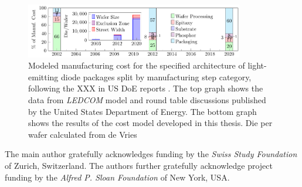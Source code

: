 \documentclass[a4paper,nocompress]{spie}  %
\begin{document}
\begin{figure} [ht]
    \begin{center}
        \includegraphics[width=0.85\textwidth]{SPIE/article/costmodel_calibration.pdf}
    \end{center}
    \caption{Modeled manufacturing cost for the specified architecture of light-emitting diode packages split by manufacturing step category, following the XXX in US DoE reports \cite{doe2016solid}. The top graph shows the data from \textit{LEDCOM} model and  round table discussions published by the United States Department of Energy. The bottom graph shows the results of the cost model developed in this thesis. Die per wafer calculated from de Vries \cite{deVries2005}}
    \label{fig:cost}
\end{figure}

\clearpage
\acknowledgments %
 
The main author gratefully acknowledges funding by the \textit{Swiss Study Foundation} of Zurich, Switzerland. The authors further gratefully acknowledge project funding by the \textit{Alfred P. Sloan Foundation} of New York, USA.

\end{document}
